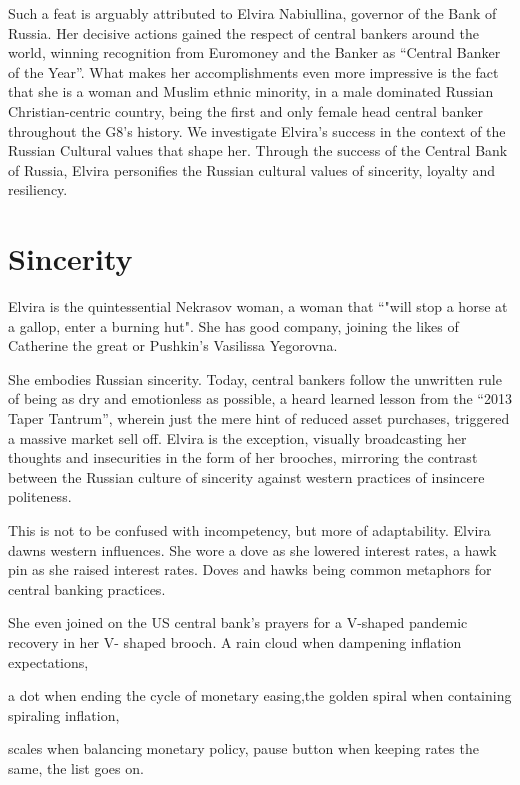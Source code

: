 \documentclass[12pt]{article}
\begin{document}
Such a feat is arguably attributed to Elvira Nabiullina, governor of the Bank of Russia. Her decisive actions gained the respect of central bankers around the world, winning recognition from Euromoney and the Banker as “Central Banker of the Year”. What makes her accomplishments even more impressive is the fact that she is a woman and Muslim ethnic minority, in a male dominated Russian Christian-centric country, being the first and only female head central banker throughout the G8’s history.  We investigate Elvira’s success in the context of the Russian Cultural values that shape her. Through the success of the Central Bank of Russia, Elvira personifies the Russian cultural values of sincerity, loyalty and resiliency.

\section{Sincerity 
\label{sec:Sincerity}}
Elvira is the quintessential Nekrasov woman, a woman that “"will stop a horse at a gallop, enter a burning hut". She has good company, joining the likes of Catherine the great or Pushkin’s Vasilissa Yegorovna. 



She embodies Russian sincerity. Today, central bankers follow the unwritten rule of being as dry and emotionless as possible, a heard learned lesson from the “2013 Taper Tantrum”, wherein just the mere hint of reduced asset purchases, triggered a massive market sell off. Elvira is the exception, visually broadcasting her thoughts and insecurities in the form of her brooches, mirroring the contrast between the Russian culture of sincerity against western practices of insincere politeness. 

This is not to be confused with incompetency, but more of adaptability. Elvira dawns western influences. She wore a dove as she lowered interest rates, a hawk pin as she raised interest rates. Doves and hawks being common metaphors for central banking practices. 


She even joined on the US central bank’s prayers for a V-shaped pandemic recovery in her V- shaped brooch. A rain cloud when dampening inflation expectations, 


a dot when ending the cycle of monetary easing,the golden spiral when containing spiraling inflation,

scales when balancing monetary policy, pause button when keeping rates the same, the list goes on. 

\end{document}
